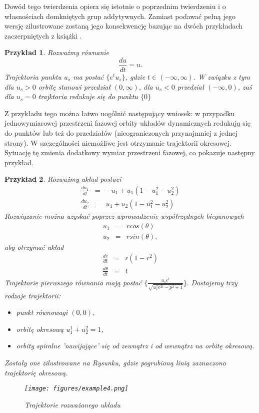 \documentclass[12pt]{article}
\newtheorem{przyklad}{Przykład}
\begin{document}
Dowód tego twierdzenia opiera się istotnie o poprzednim twierdzeniu i o własnościach domkniętych grup addytywnych. Zamiast podawać pełną jego wersję zilustrowane zostaną jego konsekwencję bazując na dwóch przykładach zaczerpniętych z książki \cite{Palczewski}.
\begin{przyklad}
	Rozważmy równanie
	\begin{equation}
	\frac{du}{dt} = u.
	\end{equation}
	Trajektoria punktu $ u_{s} $ ma postać $ \{e^tu_{s}\} $, gdzie $ t \in (-\infty,\infty) $. W związku z tym dla $ u_{s} > 0 $ orbitę stanowi przedział $ (0,\infty) $, dla $ u_{s} < 0 $ przedział $ (-\infty,0) $, zaś dla $ u_{s} = 0 $ trajktoria redukuje się do punktu $ \{0\} $
\end{przyklad}
Z przykładu tego można łatwo uogólnić następujący wniosek: w przypadku jednowymiarowej przestrzeni fazowej orbity układów dynamicznych redukują się do punktów lub też do przedziałów (nieograniczonych przynajmniej z jednej strony). W szczególności niemożliwe jest otrzymanie trajektorii okresowej. Sytuację tę zmienia dodatkowy wymiar przestrzeni fazowej, co pokazuje następny przykład.
\begin{przyklad}
	Rozważmy układ postaci
	\begin{equation}
	\begin{array}{rcr} 
		\frac{du_{1}}{dt} & = & -u_{1} + u_{1}(1 - u_{1}^2 - u_{2}^2) \\ 
		\frac{du_{2}}{dt} & = & u_{1} + u_{2}(1 - u_{1}^2 - u_{2}^2)
		\end{array}
	\end{equation}
	Rozwiązanie można uzyskać poprzez wprowadzenie współrzędnych biegunowych
	\begin{equation}
	\begin{array}{rcr} 
	u_{1} & = & rcos(\theta) \\ 
	u_{2} & = & rsin(\theta),
	\end{array}
	\end{equation}
	aby otrzymać układ
	\begin{equation}
	\begin{array}{rcl} 
	\frac{dr}{dt} & = & r(1-r^2) \\ 
	\frac{d\theta}{dt} & = & 1
	\end{array}
	\end{equation}
	Trajektorie pierwszego równania mają postać $ \{\frac{u_{s}e^t}{\sqrt{u_{s}^2e^{2t}-p^2+1}}\}. $ Dostajemy trzy rodzaje trajektorii:
	\begin{itemize}
		\item punkt równowagi $ (0,0) $,
		\item orbitę okresową $ u_{1}^1 + u_{2}^2 = 1 $,
		\item orbity spiralne 'nawijające' się od zewnątrz i od wewnątrz na orbitę okresową.
	\end{itemize}
	Zostały one zilustrowane na Rysunku, gdzie pogrubioną linią zaznaczono trajektorię okresową.
	\begin{figure}[H]
		\texttt{[image: figures/example4.png]} 
		\centering
		\caption{Trajektorie rozważanego układu}
	\end{figure}
\end{przyklad}
\end{document}
